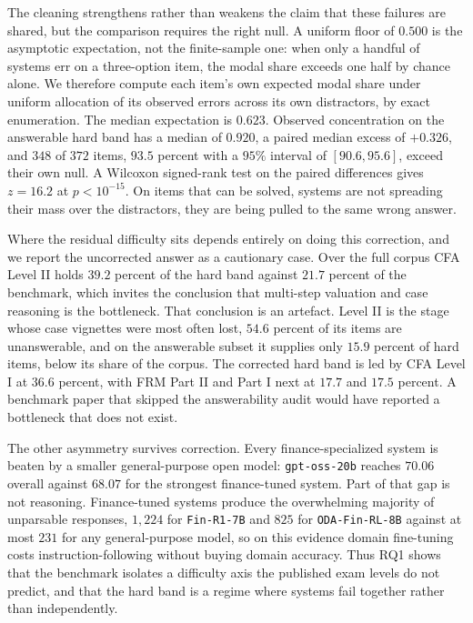 The cleaning strengthens rather than weakens the claim that these failures are shared, but the
comparison requires the right null. A uniform floor of $0.500$ is the asymptotic expectation, not
the finite-sample one: when only a handful of systems err on a three-option item, the modal share
exceeds one half by chance alone. We therefore compute each item's own expected modal share under
uniform allocation of its observed errors across its own distractors, by exact enumeration. The
median expectation is $0.623$. Observed concentration on the answerable hard band has a median of
$0.920$, a paired median excess of $+0.326$, and $348$ of $372$ items, $93.5$ percent with a
$95\%$ interval of $[90.6, 95.6]$, exceed their own null. A Wilcoxon signed-rank test on the
paired differences gives $z=16.2$ at $p<10^{-15}$. On items that can be solved, systems are not
spreading their mass over the distractors, they are being pulled to the same wrong answer.

Where the residual difficulty sits depends entirely on doing this correction, and we report the
uncorrected answer as a cautionary case. Over the full corpus CFA Level II holds $39.2$ percent
of the hard band against $21.7$ percent of the benchmark, which invites the conclusion that
multi-step valuation and case reasoning is the bottleneck. That conclusion is an artefact.
Level II is the stage whose case vignettes were most often lost, $54.6$ percent of its items are
unanswerable, and on the answerable subset it supplies only $15.9$ percent of hard items, below
its share of the corpus. The corrected hard band is led by CFA Level I at $36.6$ percent, with
FRM Part II and Part I next at $17.7$ and $17.5$ percent. A benchmark paper that skipped the
answerability audit would have reported a bottleneck that does not exist.

The other asymmetry survives correction. Every finance-specialized system is beaten by a smaller
general-purpose open model: \texttt{gpt-oss-20b} reaches $70.06$ overall against $68.07$ for the
strongest finance-tuned system. Part of that gap is not reasoning. Finance-tuned systems produce
the overwhelming majority of unparsable responses, $1{,}224$ for \texttt{Fin-R1-7B} and $825$ for
\texttt{ODA-Fin-RL-8B} against at most $231$ for any general-purpose model, so on this evidence
domain fine-tuning costs instruction-following without buying domain accuracy. Thus RQ1 shows
that the benchmark isolates a difficulty axis the published exam levels do not predict, and that
the hard band is a regime where systems fail together rather than independently.

